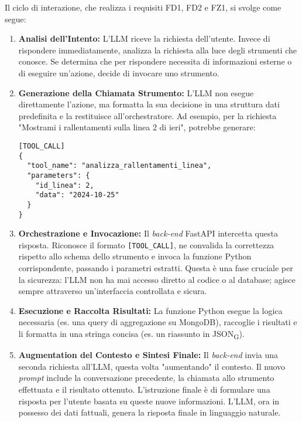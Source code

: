 Il ciclo di interazione, che realizza i requisiti FD1, FD2 e FZ1, si svolge come segue:
\begin{enumerate}
    \item \textbf{Analisi dell'Intento:} L'LLM riceve la richiesta dell'utente. Invece di rispondere immediatamente, analizza la richiesta alla luce degli strumenti che conosce. Se determina che per rispondere necessita di informazioni esterne o di eseguire un'azione, decide di invocare uno strumento.
    
    \item \textbf{Generazione della Chiamata Strumento:} L'LLM non esegue direttamente l'azione, ma formatta la sua decisione in una struttura dati predefinita e la restituisce all'orchestratore. Ad esempio, per la richiesta "Mostrami i rallentamenti sulla linea 2 di ieri", potrebbe generare:
    \begin{verbatim}
[TOOL_CALL]
{
  "tool_name": "analizza_rallentamenti_linea",
  "parameters": {
    "id_linea": 2,
    "data": "2024-10-25"
  }
}
    \end{verbatim}
    
    \item \textbf{Orchestrazione e Invocazione:} Il \textit{back-end} FastAPI intercetta questa risposta. Riconosce il formato \verb|[TOOL_CALL]|, ne convalida la correttezza rispetto allo schema dello strumento e invoca la funzione Python corrispondente, passando i parametri estratti. Questa è una fase cruciale per la sicurezza: l'LLM non ha mai accesso diretto al codice o al database; agisce sempre attraverso un'interfaccia controllata e sicura.
    
    \item \textbf{Esecuzione e Raccolta Risultati:} La funzione Python esegue la logica necessaria (es. una query di aggregazione su MongoDB), raccoglie i risultati e li formatta in una stringa concisa (es. un riassunto in JSON\textsubscript{G}).
    
    \item \textbf{Augmentation del Contesto e Sintesi Finale:} Il \textit{back-end} invia una seconda richiesta all'LLM, questa volta "aumentando" il contesto. Il nuovo \textit{prompt} include la conversazione precedente, la chiamata allo strumento effettuata e il risultato ottenuto. L'istruzione finale è di formulare una risposta per l'utente basata su queste nuove informazioni. L'LLM, ora in possesso dei dati fattuali, genera la risposta finale in linguaggio naturale.
\end{enumerate}


